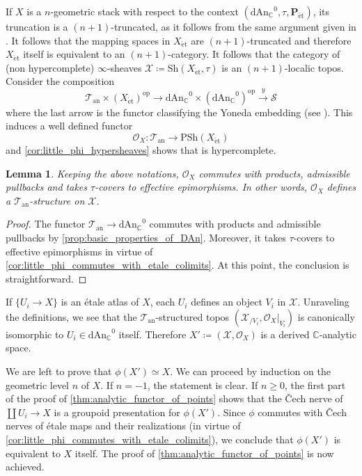 \documentclass[12pt,a4paper,reqno]{amsart}
\theoremstyle{plain}
\newtheorem{lem}[thm]{Lemma}
\theoremstyle{definition}
\theoremstyle{remark}
\numberwithin{equation}{section}
\begin{document}
If $X$ is a $n$-geometric stack with respect to the context $({\mathrm{dAn}_{\mathbb C}}^0, \tau, \mathbf P_{\mathrm{\acute{e}t}})$, its truncation is a $(n+1)$-truncated, as it follows from the same argument given in \cite[Lemma 2.1.1.2]{HAG-II}.
It follows that the mapping spaces in $X_{\mathrm{\acute{e}t}}$ are $(n+1)$-truncated and therefore $X_{\mathrm{\acute{e}t}}$ itself is equivalent to an $(n+1)$-category.
It follows that the category of (non hypercomplete) $\infty$-sheaves ${\mathcal X} \coloneqq {\mathrm{Sh}}(X_{\mathrm{\acute{e}t}}, \tau)$ is an $(n+1)$-localic topos.
Consider the composition
\[ {{\mathcal T}_{\mathrm{an}}} \times (X_{\mathrm{\acute{e}t}})^{\mathrm{op}} \to {\mathrm{dAn}_{\mathbb C}}^0 \times ({\mathrm{dAn}_{\mathbb C}}^0)^{\mathrm{op}} \xrightarrow{y} {\mathcal S} \]
where the last arrow is the functor classifying the Yoneda embedding (see \cite[Â§ 5.2.1]{Lurie_Higher_algebra}).
This induces a well defined functor
\[ {\mathcal O}_X \colon {{\mathcal T}_{\mathrm{an}}} \to {\mathrm{PSh}}(X_{\mathrm{\acute{e}t}}) \]
and \cref{cor:little_phi_hypersheaves} shows that is hypercomplete.

\begin{lem}
	Keeping the above notations, ${\mathcal O}_X$ commutes with products, admissible pullbacks and takes $\tau$-covers to effective epimorphisms.
	In other words, ${\mathcal O}_X$ defines a ${{\mathcal T}_{\mathrm{an}}}$-structure on ${\mathcal X}$.
\end{lem}

\begin{proof}
	The functor ${{\mathcal T}_{\mathrm{an}}} \to {\mathrm{dAn}_{\mathbb C}}^0$ commutes with products and admissible pullbacks by \cref{prop:basic_properties_of_DAn}. Moreover, it takes $\tau$-covers to effective epimorphisms in virtue of \cref{cor:little_phi_commutes_with_etale_colimits}.
	At this point, the conclusion is straightforward.
\end{proof}

If $\{U_i \to X\}$ is an \'etale atlas of $X$, each $U_i$ defines an object $V_i$ in ${\mathcal X}$. 
Unraveling the definitions, we see that the ${{\mathcal T}_{\mathrm{an}}}$-structured topos $({\mathcal X}_{/V_i}, {\mathcal O}_X |_{V_i})$ is canonically isomorphic to $U_i \in {\mathrm{dAn}_{\mathbb C}}^0$ itself.
Therefore $X' \coloneqq ({\mathcal X}, {\mathcal O}_X)$ is a derived {$\mathbb C$-analytic\xspace} space.

We are left to prove that $\phi(X') \simeq X$. We can proceed by induction on the geometric level $n$ of $X$.
If $n = -1$, the statement is clear.
If $n \ge 0$, the first part of the proof of \cref{thm:analytic_functor_of_points} shows that the \v{C}ech nerve of $\coprod U_i \to X$ is a groupoid presentation for $\phi(X')$. Since $\phi$ commutes with \v{C}ech nerves of \'etale maps and their realizations (in virtue of \cref{cor:little_phi_commutes_with_etale_colimits}), we conclude that $\phi(X')$ is equivalent to $X$ itself.
The proof of \cref{thm:analytic_functor_of_points} is now achieved.
\end{document}
